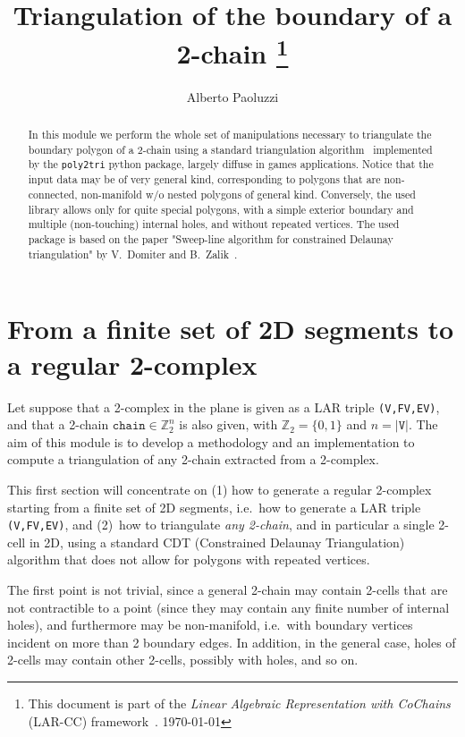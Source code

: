 \documentclass[11pt,oneside]{article}    %
\title{Triangulation of the boundary of a 2-chain
\footnote{This document is part of the \emph{Linear Algebraic Representation with CoChains} (LAR-CC) framework~\cite{cclar-proj:2013:00}. \today}
}
\author{Alberto Paoluzzi}
\def\Z{\mathbb{Z}}
\begin{document}
\maketitle
\nonstopmode

\begin{abstract}
In this module we perform the whole set of manipulations necessary to triangulate the boundary polygon of a 2-chain using a standard triangulation algorithm~\cite{} implemented by the \texttt{poly2tri} python package, largely diffuse in games applications.
Notice that the input data may be of very general kind, corresponding to polygons that are non-connected, non-manifold w/o nested polygons of general kind. Conversely, the used library allows only for quite special polygons, with a simple exterior boundary and multiple (non-touching) internal holes, and without repeated vertices. The used package is based on the paper "Sweep-line algorithm for constrained Delaunay triangulation" by V.~Domiter and B.~Zalik~\cite{poly2tri:2008}.
\end{abstract}

\tableofcontents


\section{From a finite set of 2D segments to a regular 2-complex}

Let suppose that a  2-complex in the plane is given as a LAR triple \texttt{(V,FV,EV)}, and that a 2-chain $\texttt{chain}\in\Z_2^n$ is also given, with $\Z_2=\{0,1\}$ and $n = |\texttt{V}|$.
The aim of this module is to develop a methodology and an implementation to compute a triangulation of any 2-chain extracted from a 2-complex. 

This first section will concentrate on (1) how to generate a regular 2-complex starting from a finite set of 2D segments, i.e.~how to generate a LAR triple \texttt{(V,FV,EV)},  and (2)~how to triangulate \emph{any 2-chain}, and in particular a single 2-cell in 2D, using a standard CDT  (Constrained Delaunay Triangulation) algorithm that does not allow for polygons with repeated vertices. 

The first point is not trivial, since a general 2-chain may contain 2-cells that are not contractible to a point (since they may contain any finite number of internal holes), and furthermore may be non-manifold, i.e.~with boundary vertices incident on more than 2 boundary edges. In addition, in the general case, holes of 2-cells may contain other 2-cells, possibly with holes, and so on. 
\end{document}
